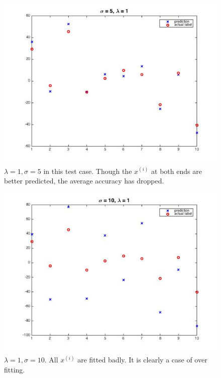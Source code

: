 \documentclass[twoside]{article}
\theoremstyle{definition}
\theoremstyle{definition}
\theoremstyle{remark}
\begin{document}
\begin{figure}[H]
\centering
\includegraphics[width=120mm]{problem1Pic3.jpg}
\caption{ $\lambda =1, \sigma = 5$ in this test case. Though the $x^{(i)}$ at both ends are better predicted, the average accuracy has dropped.    \label{problem1Pic2}}
\end{figure}

\begin{figure}[H]
\centering
\includegraphics[width=120mm]{problem1Pic4.jpg}
\caption{ $\lambda =1, \sigma = 10$.  All $x^{(i)}$ are fitted badly. It is clearly a case of over fitting.  \label{problem1Pic2}}
\end{figure}
\end{document}
